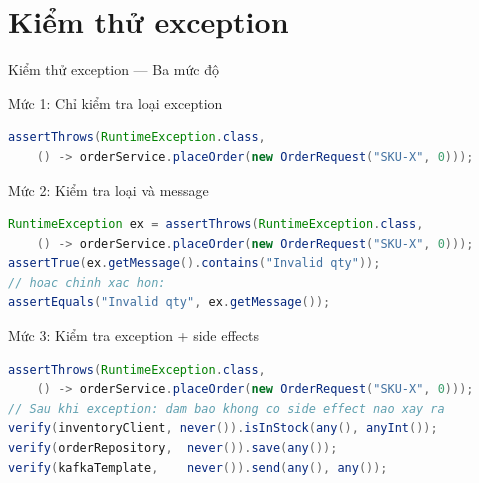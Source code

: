 \documentclass[aspectratio=169,10pt]{beamer}
\begin{document}
\section{Kiểm thử exception}

\begin{frame}[fragile,shrink=22]{Kiểm thử exception --- Ba mức độ}
  \begin{block}{Mức 1: Chỉ kiểm tra loại exception}
\begin{lstlisting}[language=java,style=nonumber]
assertThrows(RuntimeException.class,
    () -> orderService.placeOrder(new OrderRequest("SKU-X", 0)));
\end{lstlisting}
  \end{block}

  \begin{block}{Mức 2: Kiểm tra loại và message}
\begin{lstlisting}[language=java,style=nonumber]
RuntimeException ex = assertThrows(RuntimeException.class,
    () -> orderService.placeOrder(new OrderRequest("SKU-X", 0)));
assertTrue(ex.getMessage().contains("Invalid qty"));
// hoac chinh xac hon:
assertEquals("Invalid qty", ex.getMessage());
\end{lstlisting}
  \end{block}

  \begin{block}{Mức 3: Kiểm tra exception + side effects}
\begin{lstlisting}[language=java,style=nonumber]
assertThrows(RuntimeException.class,
    () -> orderService.placeOrder(new OrderRequest("SKU-X", 0)));
// Sau khi exception: dam bao khong co side effect nao xay ra
verify(inventoryClient, never()).isInStock(any(), anyInt());
verify(orderRepository,  never()).save(any());
verify(kafkaTemplate,    never()).send(any(), any());
\end{lstlisting}
  \end{block}
\end{frame}
\end{document}
